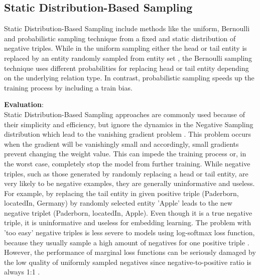 \subsection{Static Distribution-Based Sampling}
\label{subsec:static_distribution_based_sampling}

Static Distribution-Based Sampling include methods like the uniform, Bernoulli and probabilistic sampling technique from a fixed and static distribution of negative triples.	While in the uniform sampling either the head or tail entity is replaced by an entity randomly sampled from entity set \entities,
the Bernoulli sampling technique uses different probabilities for replacing head or tail entity depending on the underlying relation type.
In contrast, probabilistic sampling speeds up the training process by including a train bias.
	
\textbf{Evaluation}:\\
Static Distribution-Based Sampling approaches are commonly used because of their simplicity and efficiency, but ignore the dynamics in the Negative Sampling distribution which lead to the vanishing gradient problem \cite{qianunderstanding}.
This problem occurs when the gradient will be vanishingly small and accordingly, small gradients prevent changing the weight value.
This can impede the training process or, in the worst case, completely stop the model from further training.
While negative triples, such as those generated by randomly replacing a head or tail entity, are very likely to be negative examples, they are generally uninformative and useless.
For example, by replacing the tail entity in given positive triple (Paderborn, locatedIn, Germany) by randomly selected entity 'Apple' leads to the new negative triplet (Paderborn, locatedIn, Apple).
Even though it is a true negative triple, it is uninformative and useless for embedding learning.
The problem with 'too easy' negative triples is less severe to models using log-softmax loss function, because they usually sample a high amount of negatives for one positive triple \cite{cai2017kbgan}.
However, the performance of marginal loss functions can be seriously damaged by the low quality of uniformly sampled negatives since negative-to-positive ratio is always 1:1 \cite{cai2017kbgan}.